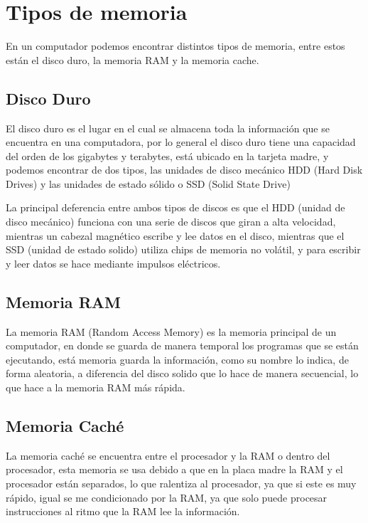 \documentclass{article}
\begin{document}
\section{Tipos de memoria} \label{contenido}
En un computador podemos encontrar distintos tipos de memoria, entre estos están el disco duro, la memoria RAM y la memoria cache.

\subsection{Disco Duro}
El disco duro es el lugar en el cual se almacena toda la información que se encuentra en una computadora, por lo general el disco duro tiene una capacidad del orden de los gigabytes y terabytes, está ubicado en la tarjeta madre, y podemos encontrar de dos tipos, las unidades de disco mecánico HDD (Hard Disk Drives) y las unidades de estado sólido o SSD (Solid State Drive)
\vspace{0.5cm}

La principal deferencia entre ambos tipos de discos es que el HDD (unidad de disco mecánico) funciona con una serie de discos que giran a alta velocidad, mientras un cabezal magnético escribe y lee datos en el disco, mientras que el SSD (unidad de estado solido) utiliza chips de memoria no volátil, y para escribir y leer datos se hace mediante impulsos eléctricos.\cite{andres2017cual} 

\subsection{Memoria RAM}
La memoria RAM (Random Access Memory) es la memoria principal de un computador, en donde se guarda de manera temporal los programas que se están ejecutando, está memoria  guarda la información, como su nombre lo indica, de forma aleatoria, a diferencia del disco solido que lo hace de manera secuencial, lo que hace a la memoria RAM más rápida.\cite{rebollo2011memoria}

\subsection{Memoria Caché}
La memoria caché se encuentra entre el procesador y la RAM o dentro del procesador, esta memoria se usa debido a que en la placa madre la RAM y el procesador están separados, lo que ralentiza al procesador, ya que si este es muy rápido, igual se me condicionado por la RAM, ya que solo puede procesar instrucciones al ritmo que la RAM lee la información.
\end{document}
